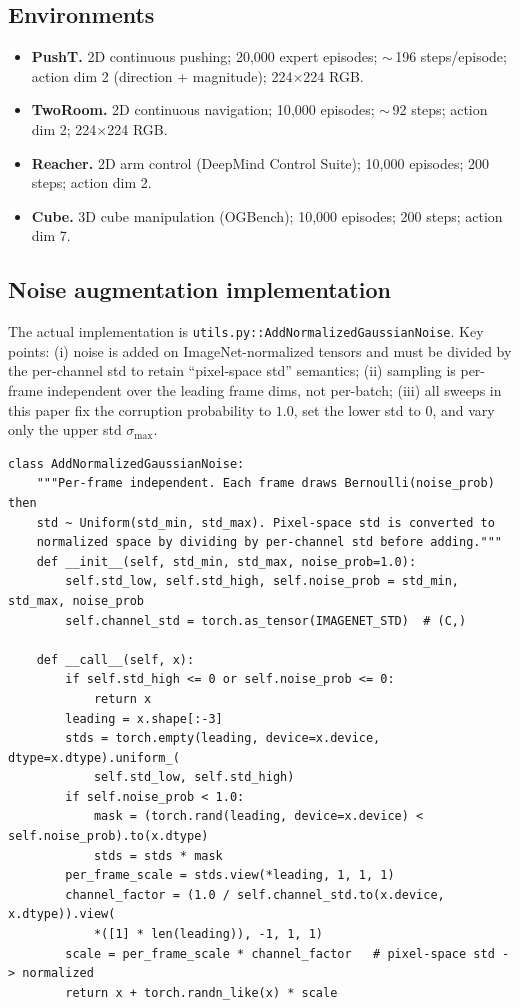 \documentclass[10pt]{article}
\newcommand{\code}[1]{\texttt{\small #1}}
\newcommand{\stdmax}{\ensuremath{\sigma_{\max}}}
\begin{document}
\subsection{Environments}
\begin{itemize}
  \item \textbf{PushT.} 2D continuous pushing; 20{,}000 expert episodes; $\sim$\,196 steps/episode; action dim 2 (direction + magnitude); 224$\times$224 RGB.
  \item \textbf{TwoRoom.} 2D continuous navigation; 10{,}000 episodes; $\sim$\,92 steps; action dim 2; 224$\times$224 RGB.
  \item \textbf{Reacher.} 2D arm control (DeepMind Control Suite); 10{,}000 episodes; 200 steps; action dim 2.
  \item \textbf{Cube.} 3D cube manipulation (OGBench); 10{,}000 episodes; 200 steps; action dim 7.
\end{itemize}

\subsection{Noise augmentation implementation}
The actual implementation is \code{utils.py::AddNormalizedGaussianNoise}. Key points: (i) noise is added on ImageNet-normalized tensors and must be divided by the per-channel std to retain ``pixel-space std'' semantics; (ii) sampling is per-frame independent over the leading frame dims, not per-batch; (iii) all sweeps in this paper fix the corruption probability to $1.0$, set the lower std to $0$, and vary only the upper std \stdmax{}.

\begin{lstlisting}
class AddNormalizedGaussianNoise:
    """Per-frame independent. Each frame draws Bernoulli(noise_prob) then
    std ~ Uniform(std_min, std_max). Pixel-space std is converted to
    normalized space by dividing by per-channel std before adding."""
    def __init__(self, std_min, std_max, noise_prob=1.0):
        self.std_low, self.std_high, self.noise_prob = std_min, std_max, noise_prob
        self.channel_std = torch.as_tensor(IMAGENET_STD)  # (C,)

    def __call__(self, x):
        if self.std_high <= 0 or self.noise_prob <= 0:
            return x
        leading = x.shape[:-3]
        stds = torch.empty(leading, device=x.device, dtype=x.dtype).uniform_(
            self.std_low, self.std_high)
        if self.noise_prob < 1.0:
            mask = (torch.rand(leading, device=x.device) < self.noise_prob).to(x.dtype)
            stds = stds * mask
        per_frame_scale = stds.view(*leading, 1, 1, 1)
        channel_factor = (1.0 / self.channel_std.to(x.device, x.dtype)).view(
            *([1] * len(leading)), -1, 1, 1)
        scale = per_frame_scale * channel_factor   # pixel-space std -> normalized
        return x + torch.randn_like(x) * scale
\end{lstlisting}
\end{document}
